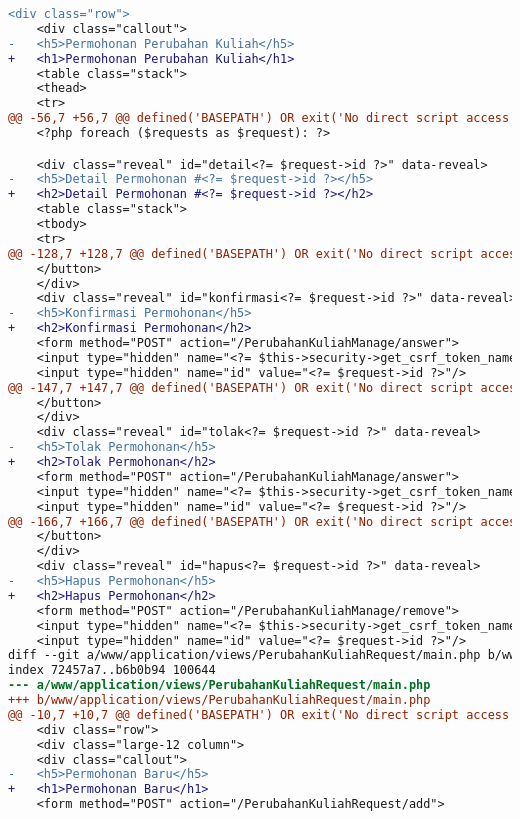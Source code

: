 \begin{itemize}
\begin{lstlisting}[frame=single, label={lst:perbaikan_1.3.1_tag_heading}, language=diff, caption=Perbaikan Kriteria Sukses 1.3.1 - Penggunaan \textit{Heading} Tidak Tepat]
    <div class="row">
    <div class="callout">
-   <h5>Permohonan Perubahan Kuliah</h5>
+   <h1>Permohonan Perubahan Kuliah</h1>
    <table class="stack">
    <thead>
    <tr>
@@ -56,7 +56,7 @@ defined('BASEPATH') OR exit('No direct script access allowed');
    <?php foreach ($requests as $request): ?>

    <div class="reveal" id="detail<?= $request->id ?>" data-reveal>
-   <h5>Detail Permohonan #<?= $request->id ?></h5>
+   <h2>Detail Permohonan #<?= $request->id ?></h2>
    <table class="stack">
    <tbody>
    <tr>
@@ -128,7 +128,7 @@ defined('BASEPATH') OR exit('No direct script access allowed');
    </button>
    </div>
    <div class="reveal" id="konfirmasi<?= $request->id ?>" data-reveal>
-   <h5>Konfirmasi Permohonan</h5>
+   <h2>Konfirmasi Permohonan</h2>
    <form method="POST" action="/PerubahanKuliahManage/answer">
    <input type="hidden" name="<?= $this->security->get_csrf_token_name() ?>" value="<?= $this->security->get_csrf_hash() ?>" />
    <input type="hidden" name="id" value="<?= $request->id ?>"/>
@@ -147,7 +147,7 @@ defined('BASEPATH') OR exit('No direct script access allowed');
    </button>
    </div>        
    <div class="reveal" id="tolak<?= $request->id ?>" data-reveal>
-   <h5>Tolak Permohonan</h5>
+   <h2>Tolak Permohonan</h2>
    <form method="POST" action="/PerubahanKuliahManage/answer">
    <input type="hidden" name="<?= $this->security->get_csrf_token_name() ?>" value="<?= $this->security->get_csrf_hash() ?>" />
    <input type="hidden" name="id" value="<?= $request->id ?>"/>
@@ -166,7 +166,7 @@ defined('BASEPATH') OR exit('No direct script access allowed');
    </button>
    </div>
    <div class="reveal" id="hapus<?= $request->id ?>" data-reveal>
-   <h5>Hapus Permohonan</h5>
+   <h2>Hapus Permohonan</h2>
    <form method="POST" action="/PerubahanKuliahManage/remove">
    <input type="hidden" name="<?= $this->security->get_csrf_token_name() ?>" value="<?= $this->security->get_csrf_hash() ?>" />
    <input type="hidden" name="id" value="<?= $request->id ?>"/>
diff --git a/www/application/views/PerubahanKuliahRequest/main.php b/www/application/views/PerubahanKuliahRequest/main.php
index 72457a7..b6b0b94 100644
--- a/www/application/views/PerubahanKuliahRequest/main.php
+++ b/www/application/views/PerubahanKuliahRequest/main.php
@@ -10,7 +10,7 @@ defined('BASEPATH') OR exit('No direct script access allowed');
    <div class="row">
    <div class="large-12 column">
    <div class="callout">
-   <h5>Permohonan Baru</h5>
+   <h1>Permohonan Baru</h1>
    <form method="POST" action="/PerubahanKuliahRequest/add">

\end{lstlisting}
\end{itemize}
